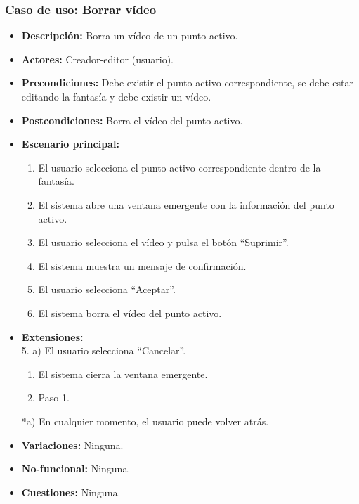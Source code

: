 \subsubsection{Caso de uso: Borrar vídeo}
\begin{itemize}
	\item \textbf{Descripción:} Borra un vídeo de un punto activo.
	\item \textbf{Actores:} Creador-editor (usuario).
	\item \textbf{Precondiciones:} Debe existir el punto activo correspondiente, se debe estar editando la fantasía y debe existir un vídeo.
	\item \textbf{Postcondiciones:} Borra el vídeo del punto activo.
	\item \textbf{Escenario principal:}
	\begin{enumerate}
		\item El usuario selecciona el punto activo correspondiente dentro de la fantasía.
		\item El sistema abre una ventana emergente con la información del punto activo.
		\item El usuario selecciona el vídeo y pulsa el botón ``Suprimir''.
		\item El sistema muestra un mensaje de confirmación.
		\item El usuario selecciona ``Aceptar''.
		\item El sistema borra el vídeo del punto activo.
	\end{enumerate}
	\item \textbf{Extensiones:} \\ 5. a) El usuario selecciona ``Cancelar''.
	\begin{enumerate}
		\item El sistema cierra la ventana emergente.
		\item Paso 1.
	\end{enumerate}
	*a) En cualquier momento, el usuario puede volver atrás.
	\item \textbf{Variaciones:} Ninguna.
	\item \textbf{No-funcional:} Ninguna.
	\item \textbf{Cuestiones:} Ninguna.
\end{itemize}


